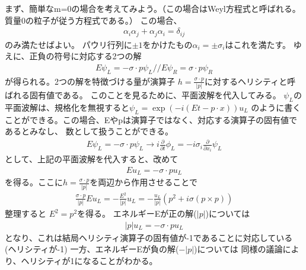 \documentclass{article}
\begin{document}
まず、簡単なm=0の場合を考えてみよう。（この場合はWeyl方程式と呼ばれる。質量0の粒子が従う方程式である。）
この場合、
\begin{eqnarray}
\alpha_i\alpha_j+\alpha_j\alpha_i=\delta_{ij}
\end{eqnarray}
のみ満たせばよい。
パウリ行列に$\pm 1$をかけたもの$\alpha_i=\pm \sigma_i$はこれを満たす。
ゆえに、正負の符号に対応する2つの解
\begin{eqnarray}
E \psi_L=-\sigma\cdot p \psi_L //
E \psi_R=\sigma\cdot p \psi_R
\end{eqnarray}
が得られる。2つの解を特徴づける量が演算子
$h=\frac{\sigma\cdot p }{|p|}$に対するヘリシティと呼ばれる固有値である。
このことを見るために、平面波解を代入してみる。
$\psi_L$の平面波解は、規格化を無視すると$\psi_L=\exp(-i(Et-p\cdot x))u_L$
のように書くことができる。この場合、Eやpは演算子ではなく、対応する演算子の固有値であるとみなし、
数として扱うことができる。
\begin{eqnarray}
E \psi_L=-\sigma\cdot p \psi_L \rightarrow i\frac{\partial}{\partial t}\phi_L=-i \sigma_i \frac{\partial}{\partial x_i} \psi_L
\end{eqnarray}
として、上記の平面波解を代入すると、改めて
\begin{eqnarray}
E u_L=-\sigma\cdot p u_L
\end{eqnarray}
を得る。ここに$h=\frac{\sigma\cdot p }{|p|}$を両辺から作用させることで
\begin{eqnarray}
\frac{\sigma\cdot p }{|p|}E u_L=-\frac{E^2}{|p|}u_L=-\frac{u_L}{|p|} (p^2+i\sigma(p \times p))
\end{eqnarray}
整理すると
$E^2=p^2$を得る。
エネルギーEが正の解($|p|$)については
\begin{eqnarray}
|p| u_L=-\sigma\cdot p u_L
\end{eqnarray}
となり、これは結局ヘリシティ演算子の固有値が-1であることに対応している(ヘリシティが-1)
一方、エネルギーEが負の解($-|p|$)については
同様の議論により、ヘリシティが1になることがわかる。
\end{document}
